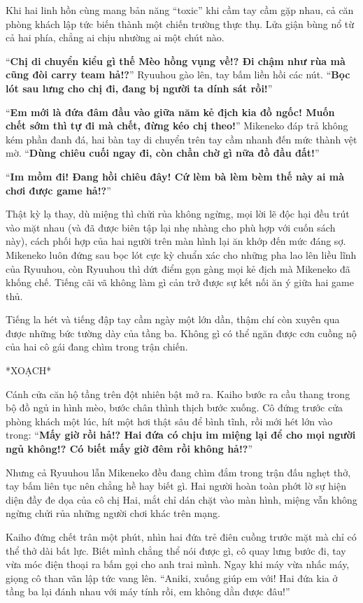 ﻿\documentclass[../main.tex]{subfiles}
\begin{document}
Khi hai linh hồn cùng mang bản năng ``toxic'' khi cầm tay cầm gặp nhau, cả căn phòng khách lập tức biến thành một chiến trường thực thụ. Lửa giận bùng nổ từ cả hai phía, chẳng ai chịu nhường ai một chút nào.

``\textbf{Chị di chuyển kiểu gì thế Mèo hồng vụng về!? Đi chậm như rùa mà cũng đòi carry team hả!?}'' Ryuuhou gào lên, tay bấm liền hồi các nút. ``\textbf{Bọc lót sau lưng cho chị đi, đang bị người ta dính sát rồi!}''

``\textbf{Em mới là đứa đâm đầu vào giữa năm kẻ địch kia đồ ngốc! Muốn chết sớm thì tự đi mà chết, đừng kéo chị theo!}'' Mikeneko đáp trả không kém phần đanh đá, hai bàn tay di chuyển trên tay cầm nhanh đến mức thành vệt mờ. ``\textbf{Dùng chiêu cuối ngay đi, còn chần chờ gì nữa đồ đầu đất!}''

``\textbf{Im mồm đi! Đang hồi chiêu đây! Cứ lèm bà lèm bèm thế này ai mà chơi được game hả!?}''

Thật kỳ lạ thay, dù miệng thì chửi rủa không ngừng, mọi lời lẽ độc hại đều trút vào mặt nhau (và đã được biên tập lại nhẹ nhàng cho phù hợp với cuốn sách này), cách phối hợp của hai người trên màn hình lại ăn khớp đến mức đáng sợ. Mikeneko luôn đứng sau bọc lót cực kỳ chuẩn xác cho những pha lao lên liều lĩnh của Ryuuhou, còn Ryuuhou thì dứt điểm gọn gàng mọi kẻ địch mà Mikeneko đã khống chế. Tiếng cãi vã không làm gì cản trở được sự kết nối ăn ý giữa hai game thủ.

Tiếng la hét và tiếng đập tay cầm ngày một lớn dần, thậm chí còn xuyên qua được những bức tường dày của tầng ba. Không gì có thể ngăn được cơn cuồng nộ của hai cô gái đang chìm trong trận chiến.

*XOẠCH*

Cánh cửa căn hộ tầng trên đột nhiên bật mở ra. Kaiho bước ra cầu thang trong bộ đồ ngủ in hình mèo, bước chân thình thịch bước xuống. Cô đứng trước cửa phòng khách một lúc, hít một hơi thật sâu để bình tĩnh, rồi mới hét lớn vào trong: ``\textbf{Mấy giờ rồi hả!? Hai đứa có chịu im miệng lại để cho mọi người ngủ không!? Có biết mấy giờ đêm rồi không hả!?}''

Nhưng cả Ryuuhou lẫn Mikeneko đều đang chìm đắm trong trận đấu nghẹt thở, tay bấm liên tục nên chẳng hề hay biết gì. Hai người hoàn toàn phớt lờ sự hiện diện đầy đe dọa của cô chị Hai, mắt chỉ dán chặt vào màn hình, miệng vẫn không ngừng chửi rủa những người chơi khác trên mạng.

Kaiho đứng chết trân một phút, nhìn hai đứa trẻ điên cuồng trước mặt mà chỉ có thể thở dài bất lực. Biết mình chẳng thể nói được gì, cô quay lưng bước đi, tay vừa móc điện thoại ra bấm gọi cho anh trai mình. Ngay khi máy vừa nhấc máy, giọng cô than vãn lập tức vang lên. ``Aniki, xuống giúp em với! Hai đứa kia ở tầng ba lại đánh nhau với máy tính rồi, em không dằn được đâu!''
\end{document}
